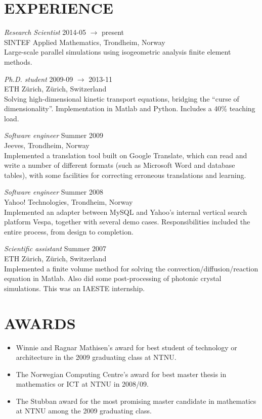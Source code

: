 \documentclass[line,margin]{res}
\newcommand{\zh}{Z\"{u}rich}
\begin{document}
\begin{resume}
\section{EXPERIENCE}

{\em Research Scientist} \hfill 2014-05 $\to$ present \\
SINTEF Applied Mathematics, Trondheim, Norway \\
Large-scale parallel simulations using isogeometric analysis finite element methods.

{\em Ph.D. student} \hfill 2009-09 $\to$ 2013-11 \\
ETH \zh, \zh, Switzerland \\
Solving high-dimensional kinetic transport equations, bridging the ``curse of dimensionality''.
Implementation in Matlab and Python. Includes a 40\% teaching load.

{\em Software engineer} \hfill Summer 2009 \\
Jeeves, Trondheim, Norway \\
Implemented a translation tool built on Google Translate, which can read and write a number of
different formats (such as Microsoft Word and database tables), with some facilities for correcting
erroneous translations and learning.

{\em Software engineer} \hfill Summer 2008 \\
Yahoo! Technologies, Trondheim, Norway \\
Implemented an adapter between MySQL and Yahoo's internal vertical search platform Vespa, together
with several demo cases. Responsibilities included the entire process, from design to completion.

{\em Scientific assistant} \hfill Summer 2007 \\
ETH \zh, \zh, Switzerland \\
Implemented a finite volume method for solving the convection/diffusion/reaction equation in
Matlab. Also did some post-processing of photonic crystal simulations. This was an IAESTE
internship.

\newpage

\section{AWARDS}

\begin{itemize}
\item Winnie and Ragnar Mathisen's award for best student of technology
  or architecture in the 2009 graduating class at NTNU.
\item The Norwegian Computing Centre's award for best master thesis in
  mathematics or ICT at NTNU in 2008/09.
\item The Stubban award for the most promising master candidate in
  mathematics at NTNU among the 2009 graduating class.
\end{itemize}



\end{resume}
\end{document}
